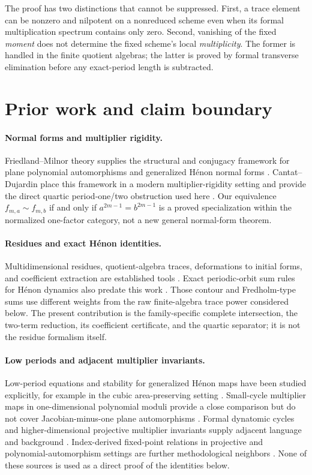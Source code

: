 \documentclass[11pt]{article}
\theoremstyle{definition}
\theoremstyle{remark}
\begin{document}
The proof has two distinctions that cannot be suppressed.  First, a trace
element can be nonzero and nilpotent on a nonreduced scheme even when its
formal multiplication spectrum contains only zero.  Second, vanishing of the
fixed \emph{moment} does not determine the fixed scheme's local
\emph{multiplicity}.  The former is handled in the finite quotient algebras;
the latter is proved by formal transverse elimination before any
exact-period length is subtracted.

\section{Prior work and claim boundary}
\label{sec:prior}

\paragraph{Normal forms and multiplier rigidity.}
Friedland--Milnor theory supplies the structural and conjugacy framework for
plane polynomial automorphisms and generalized H\'enon normal forms
\citep{FriedlandMilnor1989}.  Cantat--Dujardin place this
framework in a modern multiplier-rigidity setting and provide the direct
quartic period-one/two obstruction used here
\citep{CantatDujardin2026}.  Our equivalence
\(f_{m,a}\sim f_{m,b}\) if and only if
\(a^{2m-1}=b^{2m-1}\) is a proved specialization within the normalized
one-factor category, not a new general normal-form theorem.

\paragraph{Residues and exact H\'enon identities.}
Multidimensional residues, quotient-algebra traces, deformations to initial
forms, and coefficient extraction are established tools
\citep{CattaniDickensteinSturmfels1996}.  Exact periodic-orbit sum
rules for H\'enon dynamics also predate this work
\citep{CvitanovicHansenRolfVattay1998}.  Those contour and
Fredholm-type sums use different weights from the raw finite-algebra trace
power considered below.  The present contribution is the family-specific
complete intersection, the two-term reduction, its coefficient certificate,
and the quartic separator; it is not the residue formalism itself.

\paragraph{Low periods and adjacent multiplier invariants.}
Low-period equations and stability for generalized H\'enon maps have been
studied explicitly, for example in the cubic area-preserving setting
\citep{DullinMeiss2000}.  Small-cycle multiplier maps in
one-dimensional polynomial moduli provide a close comparison but do not
cover Jacobian-minus-one plane automorphisms
\citep{Huguin2024}.  Formal dynatomic cycles and
higher-dimensional projective multiplier invariants supply adjacent language
and background \citep{Hutz2010,Hutz2020}.
Index-derived fixed-point relations in projective and polynomial-automorphism
settings are further methodological neighbors
\citep{GuillotRamirez2019,Ueda2004}.  None of these
sources is used as a direct proof of the identities below.
\end{document}
